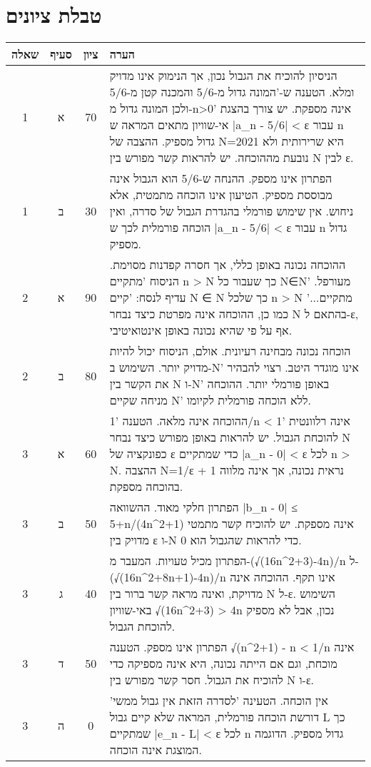 \documentclass{article}
\begin{document}
\section*{טבלת ציונים}
\begin{RTL}
\begin{tabular}{|c|c|c|p{10cm}|}
\hline
שאלה & סעיף & ציון & הערה \\
\hline
1 & א & 70 & הניסיון להוכיח את הגבול נכון, אך הנימוק אינו מדויק ומלא.  הטענה ש-'המונה גדול מ-5/6 והמכנה קטן מ-5/6 ולכן המונה גדול מ-n>0' אינה מספקת. יש צורך בהצגת אי-שוויון מתאים המראה ש |a\_n - 5/6| < ε עבור n גדול מספיק.  ההצבה של N=2021 היא שרירותית ולא נובעת מההוכחה. יש להראות קשר מפורש בין N לבין ε. \\ \hline
1 & ב & 30 & הפתרון אינו מספק. ההנחה ש-5/6 הוא הגבול אינה מבוססת מספיק.  הטיעון אינו הוכחה מתמטית, אלא ניחוש.  אין שימוש פורמלי בהגדרת הגבול של סדרה, ואין הוכחה פורמלית לכך ש |a\_n - 5/6| < ε עבור n גדול מספיק. \\ \hline
2 & א & 90 & ההוכחה נכונה באופן כללי, אך חסרה קפדנות מסוימת.  הניסוח 'מתקיים n > N כך שעבור כל N∈N' מעורפל.  עדיף לנסח: 'קיים N ∈ N כך שלכל n > N מתקיים...'  כמו כן,  ההוכחה אינה מפרטת כיצד נבחר N בהתאם ל-ε,  אף על פי שהיא נכונה באופן אינטואיטיבי. \\ \hline
2 & ב & 80 & הוכחה נכונה מבחינה רעיונית.  אולם,  הניסוח יכול להיות מדויק יותר.  השימוש ב-N' אינו מוגדר היטב. רצוי להבהיר את הקשר בין N ו-N' באופן פורמלי יותר.  ההוכחה מניחה שקיים N'  ללא הוכחה פורמלית לקיומו. \\ \hline
3 & א & 60 & ההוכחה אינה מלאה.  הטענה '1/n < 1' אינה רלוונטית להוכחת הגבול.  יש להראות באופן מפורש כיצד נבחר N כפונקציה של ε כדי שמתקיים |a\_n - 0| < ε לכל n > N.  ההצבה N=1/ε + 1 נראית נכונה, אך אינה מלווה בהוכחה מספקת. \\ \hline
3 & ב & 50 & הפתרון חלקי מאוד.  ההשוואה |b\_n - 0| ≤ 5+n/(4n\^{}2+1) אינה מספקת.  יש להוכיח קשר מתמטי מדויק בין  ε ו-N  כדי להראות שהגבול הוא 0. \\ \hline
3 & ג & 40 & הפתרון מכיל טעויות.  המעבר מ-(√(16n\^{}2+3)-4n)/n  ל-(√(16n\^{}2+8n+1)-4n)/n אינו תקף.  ההוכחה אינה מדויקת, ואינה מראה קשר ברור בין N ל-ε.  השימוש באי-שוויון  √(16n\^{}2+3) > 4n  נכון, אבל לא מספיק להוכחת הגבול. \\ \hline
3 & ד & 50 & הפתרון אינו מספק.  הטענה  √(n\^{}2+1) - n < 1/n אינה מוכחת, וגם אם הייתה נכונה, היא אינה מספיקה כדי להוכיח את הגבול.  חסר קשר מפורש בין N ו-ε. \\ \hline
3 & ה & 0 & אין הוכחה.  הטעינה 'לסדרה הזאת אין גבול ממשי' דורשת הוכחה פורמלית, המראה שלא קיים גבול L כך שמתקיים |e\_n - L| < ε לכל n גדול מספיק.  הדוגמה המוצגת אינה הוכחה. \\ \hline

\end{tabular}
\end{RTL}
\end{document}

